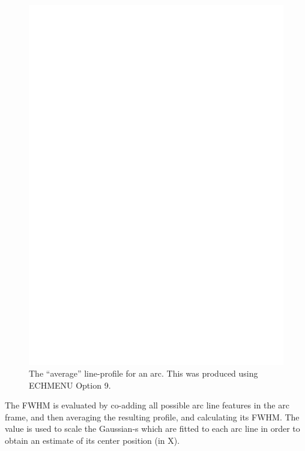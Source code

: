\documentclass[11pt,twoside]{article}
\newcommand{\sunspec}[2]{#1}
\renewcommand{\sunspec}[2]{#2}
\begin{document}
\begin{figure}
\begin{center}
\includegraphics[width=\textwidth]{sun152_07.eps}

\parbox{140mm}{
\caption{The ``average'' line-profile for an arc.  This was produced using
ECHMENU Option 9.}
\label{fi_linewidth}
}
\end{center}
\end{figure}

The FWHM is evaluated by co-adding all possible arc line features in the
arc frame, and then averaging the resulting profile, and calculating its
FWHM. The value is used to scale the Gaussian-s which are fitted to each
arc line in order to obtain an estimate of its center position (in X).
\end{document}
